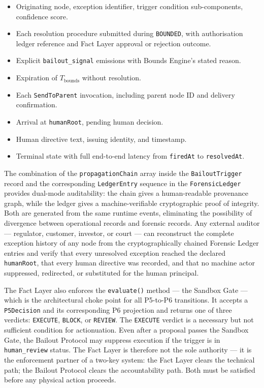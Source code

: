 \begin{itemize}\itemsep=0pt
\item[\texttt{bailout-trigger}] Originating node, exception identifier, trigger condition sub-components, confidence score.
\item[\texttt{bounds-resolution-attempt}] Each resolution procedure submitted during \texttt{BOUNDED}, with authorisation ledger reference and Fact Layer approval or rejection outcome.
\item[\texttt{bailout-signal}] Explicit \texttt{bailout\_signal} emissions with Bounds Engine's stated reason.
\item[\texttt{timeout-bounds-expired}] Expiration of $T_{\text{bounds}}$ without resolution.
\item[\texttt{parent-escalation}] Each \texttt{SendToParent} invocation, including parent node ID and delivery confirmation.
\item[\texttt{human-acknowledged}] Arrival at \texttt{humanRoot}, pending human decision.
\item[\texttt{human-directive}] Human directive text, issuing identity, and timestamp.
\item[\texttt{resolved}] Terminal state with full end-to-end latency from \texttt{firedAt} to \texttt{resolvedAt}.
\end{itemize}

The combination of the \texttt{propagationChain} array inside the \texttt{BailoutTrigger} record and the corresponding \texttt{LedgerEntry} sequence in the \texttt{ForensicLedger} provides dual-mode auditability: the chain gives a human-readable provenance graph, while the ledger gives a machine-verifiable cryptographic proof of integrity. Both are generated from the same runtime events, eliminating the possibility of divergence between operational records and forensic records. Any external auditor — regulator, customer, investor, or court — can reconstruct the complete exception history of any node from the cryptographically chained Forensic Ledger entries and verify that every unresolved exception reached the declared \texttt{humanRoot}, that every human directive was recorded, and that no machine actor suppressed, redirected, or substituted for the human principal.

The Fact Layer also enforces the \texttt{evaluate()} method — the Sandbox Gate — which is the architectural choke point for all P5-to-P6 transitions. It accepts a \texttt{P5Decision} and its corresponding P6 projection and returns one of three verdicts: \texttt{EXECUTE}, \texttt{BLOCK}, or \texttt{REVIEW}. The \texttt{EXECUTE} verdict is a necessary but not sufficient condition for actionuation. Even after a proposal passes the Sandbox Gate, the Bailout Protocol may suppress execution if the trigger is in \texttt{human\_review} status. The Fact Layer is therefore not the sole authority — it is the enforcement partner of a two-key system: the Fact Layer clears the technical path; the Bailout Protocol clears the accountability path. Both must be satisfied before any physical action proceeds.

